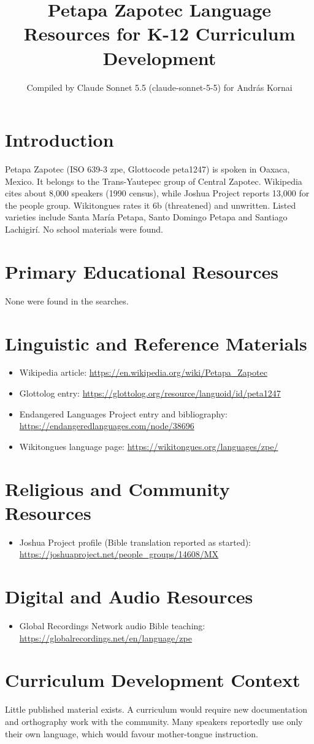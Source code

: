\documentclass[12pt]{article}
\title{Petapa Zapotec Language Resources for K-12 Curriculum Development}
\author{Compiled by Claude Sonnet 5.5 (claude-sonnet-5-5) for Andr\'as Kornai}
\date{}
\begin{document}
\maketitle

\section{Introduction}
Petapa Zapotec (ISO 639-3 zpe, Glottocode peta1247) is spoken in Oaxaca, Mexico. It belongs to the Trans-Yautepec group of Central Zapotec. Wikipedia cites about 8,000 speakers (1990 census), while Joshua Project reports 13,000 for the people group. Wikitongues rates it 6b (threatened) and unwritten. Listed varieties include Santa Mar\'ia Petapa, Santo Domingo Petapa and Santiago Lachigir\'i. No school materials were found.

\section{Primary Educational Resources}
None were found in the searches.

\section{Linguistic and Reference Materials}
\begin{itemize}
\item Wikipedia article: \url{https://en.wikipedia.org/wiki/Petapa_Zapotec}
\item Glottolog entry: \url{https://glottolog.org/resource/languoid/id/peta1247}
\item Endangered Languages Project entry and bibliography: \url{https://endangeredlanguages.com/node/38696}
\item Wikitongues language page: \url{https://wikitongues.org/languages/zpe/}
\end{itemize}

\section{Religious and Community Resources}
\begin{itemize}
\item Joshua Project profile (Bible translation reported as started): \url{https://joshuaproject.net/people_groups/14608/MX}
\end{itemize}

\section{Digital and Audio Resources}
\begin{itemize}
\item Global Recordings Network audio Bible teaching: \url{https://globalrecordings.net/en/language/zpe}
\end{itemize}

\section{Curriculum Development Context}
Little published material exists. A curriculum would require new documentation and orthography work with the community. Many speakers reportedly use only their own language, which would favour mother-tongue instruction.
\end{document}
